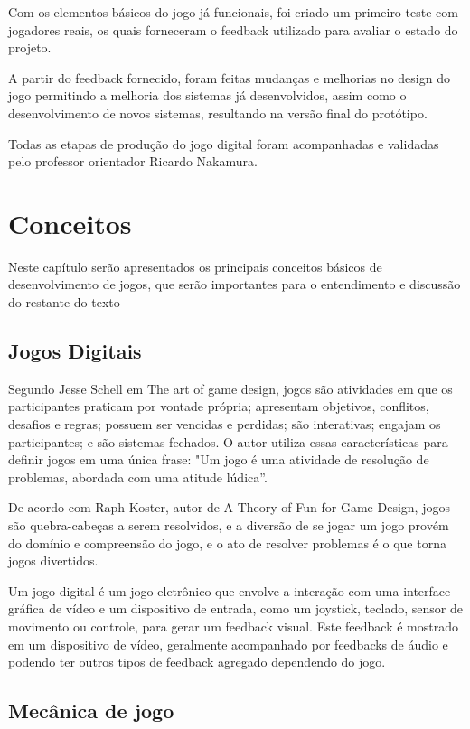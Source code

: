 \documentclass[
	12pt,				%
	openright,			%
	twoside,			%
	a4paper,			%
	english,			%
	french,				%
	spanish,			%
	brazil				%
	]{abntex2}
\begin{document}
Com os elementos básicos do jogo já funcionais, foi criado um primeiro teste com jogadores reais, os quais forneceram o feedback utilizado para avaliar o estado do projeto.

A partir do feedback fornecido, foram feitas mudanças e melhorias no design do jogo permitindo a melhoria dos sistemas já desenvolvidos, assim como o desenvolvimento de novos sistemas, resultando na versão final do protótipo.

Todas as etapas de produção do jogo digital foram acompanhadas e validadas pelo professor orientador Ricardo Nakamura.

\chapter{Conceitos}

Neste capítulo serão apresentados os principais conceitos básicos de desenvolvimento de jogos, que serão importantes para o entendimento e discussão do restante do texto

\section{Jogos Digitais}

Segundo Jesse Schell em The art of game design, jogos são atividades em que os participantes praticam por vontade própria; apresentam objetivos, conflitos, desafios e regras; possuem ser vencidas e perdidas; são interativas; engajam os participantes; e são sistemas fechados. O autor utiliza essas características para definir jogos em uma única frase: "Um jogo é uma atividade de resolução de problemas, abordada com uma atitude lúdica”.~\cite{TheArt}

De acordo com Raph Koster, autor de A Theory of Fun for Game Design, jogos são quebra-cabeças a serem resolvidos, e a diversão de se jogar um jogo provém do domínio e compreensão do jogo, e o ato de resolver problemas é o que torna jogos divertidos.~\cite{TheFun}

Um jogo digital é um jogo eletrônico que envolve a interação com uma interface gráfica de vídeo e um dispositivo de entrada, como um joystick, teclado, sensor de movimento ou controle, para gerar um feedback visual. Este feedback é mostrado em um dispositivo de vídeo, geralmente acompanhado por feedbacks de áudio e podendo ter outros tipos de feedback agregado dependendo do jogo.~\cite{Wiki02}

\section{Mecânica de jogo}
\end{document}
